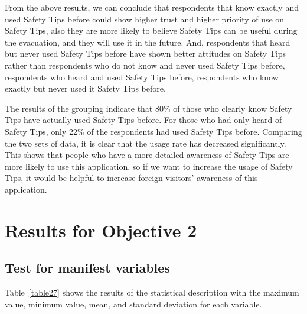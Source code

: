 From the above results, we can conclude that respondents that know exactly and used Safety Tips before could show higher trust and higher priority of use on Safety Tips, also they are more likely to believe Safety Tips can be useful during the evacuation, and they will use it in the future. And, respondents that heard but never used  Safety Tips before have shown better attitudes on Safety Tips rather than respondents who do not know and never used  Safety Tips before, respondents who heard and used Safety Tips before, respondents who know exactly but never used it Safety Tips before.

The results of the grouping indicate that 80\% of those who clearly know Safety Tips have actually used Safety Tips before. For those who had only heard of Safety Tips, only 22\% of the respondents had used Safety Tips before. Comparing the two sets of data, it is clear that the usage rate has decreased significantly. This shows that people who have a more detailed awareness of Safety Tips are more likely to use this application, so if we want to increase the usage of Safety Tips, it would be helpful to increase foreign visitors' awareness of this application.
\cleardoublepage
\section{Results for Objective 2 }
\subsection{Test for manifest variables }
Table~\ref{table27} shows the results of the statistical description with the maximum value, minimum value, mean, and standard deviation for each variable.

